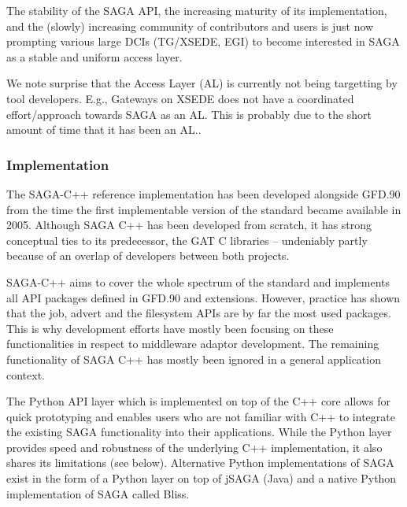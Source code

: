 \documentclass{article}
\begin{document}
  The stability of the SAGA API, the increasing maturity of its
  implementation, and the (slowly) increasing community of contributors
  and users is just now prompting various large DCIs (TG/XSEDE, EGI) to
  become interested in SAGA as a stable and uniform access layer.  %

  We note surprise that the Access Layer (AL) is currently not being
  targetting by tool developers. E.g., Gateways on XSEDE does not have
  a coordinated effort/approach towards SAGA as an AL. This is
  probably due to the short amount of time that it has been an AL..

  \subsubsection{Implementation}

   The SAGA-C++ reference implementation has been developed alongside
   GFD.90 from the time the first implementable version of the standard
   became available in 2005. Although SAGA C++ has been developed from
   scratch, it has strong conceptual ties to its predecessor, the GAT
   C libraries -- undeniably partly because of an overlap of developers
   between both projects.

   SAGA-C++ aims to cover the whole spectrum of the standard and
   implements all API packages defined in GFD.90 and extensions.
   However, practice has shown that the job, advert and the filesystem
   APIs are by far the most used packages.  
   This is why development efforts have mostly been focusing
   on these functionalities in respect to middleware adaptor
   development. The remaining functionality of SAGA C++ has mostly 
   been ignored in a general application context.
     
   The Python API layer which is implemented on top of the C++ core
   allows for quick prototyping and enables users who are not familiar
   with C++ to integrate the existing SAGA functionality into their
   applications. While the Python layer provides speed and robustness 
   of the underlying C++ implementation, it also shares its limitations
   (see below). Alternative Python implementations of SAGA exist in 
   the form of a Python layer on top of jSAGA (Java) and a native Python
   implementation of SAGA called Bliss\cite{bliss_web}.
\end{document}
